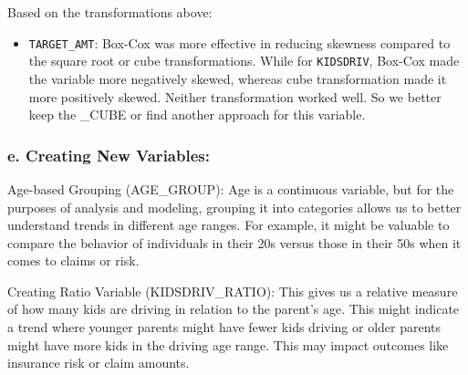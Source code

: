 \documentclass[
]{article}
\newenvironment{Shaded}{\begin{snugshade}}{\end{snugshade}}
\newcommand{\AttributeTok}[1]{\textcolor[rgb]{0.13,0.29,0.53}{#1}}
\newcommand{\CommentTok}[1]{\textcolor[rgb]{0.56,0.35,0.01}{\textit{#1}}}
\newcommand{\ConstantTok}[1]{\textcolor[rgb]{0.56,0.35,0.01}{#1}}
\newcommand{\DecValTok}[1]{\textcolor[rgb]{0.00,0.00,0.81}{#1}}
\newcommand{\FunctionTok}[1]{\textcolor[rgb]{0.13,0.29,0.53}{\textbf{#1}}}
\newcommand{\NormalTok}[1]{#1}
\newcommand{\OtherTok}[1]{\textcolor[rgb]{0.56,0.35,0.01}{#1}}
\newcommand{\SpecialCharTok}[1]{\textcolor[rgb]{0.81,0.36,0.00}{\textbf{#1}}}
\newcommand{\StringTok}[1]{\textcolor[rgb]{0.31,0.60,0.02}{#1}}
\providecommand{\tightlist}{%
  \setlength{\itemsep}{0pt}\setlength{\parskip}{0pt}}
\begin{document}
Based on the transformations above:

\begin{itemize}
\tightlist
\item
  \texttt{TARGET\_AMT}: Box-Cox was more effective in reducing skewness
  compared to the square root or cube transformations. While for
  \texttt{KIDSDRIV}, Box-Cox made the variable more negatively skewed,
  whereas cube transformation made it more positively skewed. Neither
  transformation worked well. So we better keep the \_CUBE or find
  another approach for this variable.
\end{itemize}

\subsubsection{e. Creating New
Variables:}\label{e.-creating-new-variables}

Age-based Grouping (AGE\_GROUP): Age is a continuous variable, but for
the purposes of analysis and modeling, grouping it into categories
allows us to better understand trends in different age ranges. For
example, it might be valuable to compare the behavior of individuals in
their 20s versus those in their 50s when it comes to claims or risk.

\begin{Shaded}
\end{Shaded}

Creating Ratio Variable (KIDSDRIV\_RATIO): This gives us a relative
measure of how many kids are driving in relation to the parent's age.
This might indicate a trend where younger parents might have fewer kids
driving or older parents might have more kids in the driving age range.
This may impact outcomes like insurance risk or claim amounts.

\begin{Shaded}
\end{Shaded}
\end{document}
